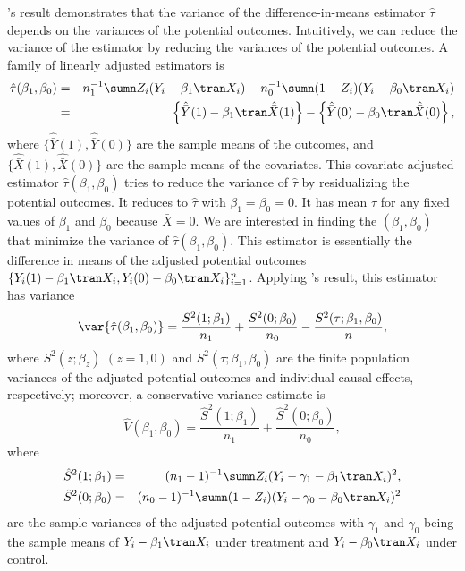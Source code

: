 \citet{Neyman:1923}'s result demonstrates that the variance of the difference-in-means estimator $\hat{\tau}$ depends on the variances of the potential outcomes. Intuitively, we can reduce the variance of the estimator by reducing the variances of the potential outcomes. A family of linearly adjusted estimators is
\begin{eqnarray} 
\hat{\tau}(\beta_1, \beta_0) &=& n_1^{-1} \sumn Z_i(Y_i - \beta_1\tran X_i) - n_0^{-1} \sumn (1-Z_i) (Y_i - \beta_0\tran X_i)  \label{eq::linear-adj-1}\\
&=& \left\{  \hat{\bar{Y}}(1) - \beta_1\tran \hat{\bar{X} }(1) \right\}  -  \left\{   \hat{\bar{Y}}(0) - \beta_0\tran \hat{\bar{X} }(0) \right\},
\label{eq::linear-adj-2}
\end{eqnarray}
where $\{ \hat{\bar{Y}}(1), \hat{\bar{Y}}(0) \}$ are the sample means of the outcomes, and $\{ \hat{\bar{X} }(1), \hat{\bar{X} }(0)\}$ are the sample means of the covariates. This covariate-adjusted estimator $\hat{\tau}(\beta_1, \beta_0)$ tries to reduce the variance of $\hat\tau$ by residualizing the potential outcomes. It reduces to $\hat\tau$ with $\beta_1 = \beta_0 = 0$. 
It has mean $\tau$ for any fixed values of $\beta_1$ and $\beta_0$ because $\bar{X}  = 0.$ We are interested in finding the $(\beta_1, \beta_0)$ that minimize the variance of $\hat{\tau}(\beta_1, \beta_0)$. This estimator is essentially the difference in means of the adjusted potential outcomes $\{ Y_i(1) - \beta_1\tran X_i  , Y_i(0) - \beta_0\tran  X_i \}_{i=1}^n $. Applying \citet{Neyman:1923}'s result, this estimator has variance
$$
\var\{ \hat{\tau}(\beta_1, \beta_0) \} = \frac{ {S}^2(1; \beta_1) }{ n_1 } + \frac{ {S}^2(0; \beta_0) }{ n_0 }
- \frac{  S^2(\tau; \beta_1, \beta_0)  }{ n },
$$
where $ {S}^2(z; \beta_z)$ $(z=1,0)$ and $S^2(\tau; \beta_1, \beta_0)$ are the finite population variances of the adjusted potential outcomes and individual causal effects, respectively; moreover,  a conservative variance estimate is 
$$
\hat{V}( \beta_1, \beta_0 ) = \frac{ \hat{S}^2(1; \beta_1) }{ n_1 } + \frac{ \hat{S}^2(0; \beta_0) }{ n_0 },
$$
where 
\begin{eqnarray*}
\hat{S}^2(1; \beta_1) &=& (n_1-1)^{-1} \sumn Z_i  ( Y_i - \gamma_1 - \beta_1\tran  X_i )^2,\\ 
\hat{S}^2(0; \beta_0) &=& (n_0-1)^{-1} \sumn (1-Z_i)  ( Y_i - \gamma_0 - \beta_0\tran  X_i )^2
\end{eqnarray*}
are the sample variances of the adjusted potential outcomes with $\gamma_1$ and $\gamma_0$ being the sample means of  $Y_i - \beta_1\tran  X_i$ under treatment and $Y_i   - \beta_0\tran  X_i $ under control. 
